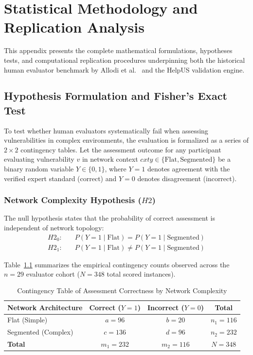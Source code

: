 \chapter{Statistical Methodology and Replication Analysis}
\label{app:statistical_methods}

This appendix presents the complete mathematical formulations, hypotheses tests, and computational replication procedures underpinning both the historical human evaluator benchmark by Allodi et al.~\cite{santos2017estimating} and the HelpUS validation engine.

\section{Hypothesis Formulation and Fisher's Exact Test}
\label{sec:fisher_formulation}
To test whether human evaluators systematically fail when assessing vulnerabilities in complex environments, the evaluation is formalized as a series of $2 \times 2$ contingency tables. Let the assessment outcome for any participant evaluating vulnerability $v$ in network context $cxty \in \{\text{Flat}, \text{Segmented}\}$ be a binary random variable $Y \in \{0, 1\}$, where $Y = 1$ denotes agreement with the verified expert standard (correct) and $Y = 0$ denotes disagreement (incorrect).

\subsection{Network Complexity Hypothesis ($H2$)}
The null hypothesis states that the probability of correct assessment is independent of network topology:
\begin{align}
    H2_0: \quad & P(Y = 1 \mid \text{Flat}) = P(Y = 1 \mid \text{Segmented}) \\
    H2_1: \quad & P(Y = 1 \mid \text{Flat}) \neq P(Y = 1 \mid \text{Segmented})
\end{align}

Table~\ref{tab:app_contingency_network} summarizes the empirical contingency counts observed across the $n=29$ evaluator cohort ($N=348$ total scored instances).

\begin{table}[htbp]
\centering
\caption{Contingency Table of Assessment Correctness by Network Complexity}
\label{tab:app_contingency_network}
\begin{tabular}{lccc}
\toprule
\textbf{Network Architecture} & \textbf{Correct ($Y=1$)} & \textbf{Incorrect ($Y=0$)} & \textbf{Total} \\
\midrule
Flat (Simple)         & $a = 96$  & $b = 20$  & $n_1 = 116$ \\
Segmented (Complex)   & $c = 136$ & $d = 96$  & $n_2 = 232$ \\
\midrule
\textbf{Total}        & $m_1 = 232$ & $m_2 = 116$ & $N = 348$ \\
\bottomrule
\end{tabular}
\end{table}

